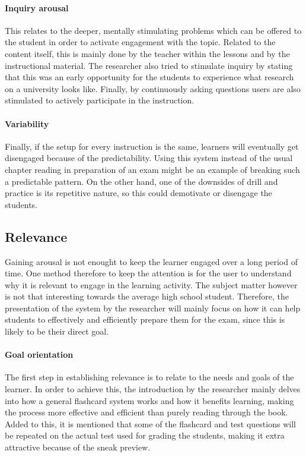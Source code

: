 \paragraph{Inquiry arousal} This relates to the deeper, mentally stimulating problems which can be offered to the student in order to activate engagement with the topic. Related to the content itself, this is mainly done by the teacher within the lessons and by the instructional material. The researcher also tried to stimulate inquiry by stating that this was an early opportunity for the students to experience what research on a university looks like. Finally, by continuously asking questions users are also stimulated to actively participate in the instruction.

\paragraph{Variability} Finally, if the setup for every instruction is the same, learners will eventually get disengaged because of the predictability. Using this system instead of the usual chapter reading in preparation of an exam might be an example of breaking such a predictable pattern. On the other hand, one of the downsides of drill and practice is its repetitive nature, so this could demotivate or disengage the students.

        \subsection{Relevance}

Gaining arousal is not enought to keep the learner engaged over a long period of time. One method therefore to keep the attention is for the user to understand why it is relevant to engage in the learning activity. The subject matter however is not that interesting towards the average high school student. Therefore, the presentation of the system by the researcher will mainly focus on how it can help students to effectively and efficiently prepare them for the exam, since this is likely to be their direct goal.

\paragraph{Goal orientation} The first step in establishing relevance is to relate to the needs and goals of the learner. In order to achieve this, the introduction by the researcher mainly delves into how a general flashcard system works and how it benefits learning, making the process more effective and efficient than purely reading through the book. Added to this, it is mentioned that some of the flashcard and test questions will be repeated on the actual test used for grading the students, making it extra attractive because of the sneak preview.

